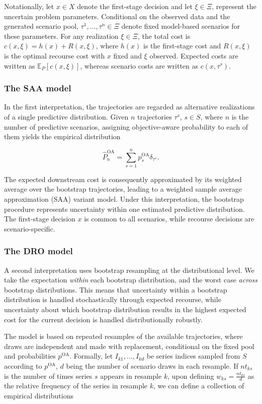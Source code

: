 \documentclass[mnsc,sglanonrev]{informs4}  %
\theoremstyle{remark}\newtheorem{remark}{Remark}
\begin{document}
Notationally, let \(x\in X\) denote the first-stage decision and let \(\xi \in \Xi\), represent the uncertain problem parameters. Conditional on the observed data and the generated scenario pool, \(\tau^1,\ldots,\tau^n\in\Xi\) denote fixed model-based scenarios for these parameters. For any realization \(\xi\in\Xi\), the total cost is $c(x,\xi)=h(x)+R(x,\xi)$, where $h(x)$ is the first-stage cost and $R(x,\xi)$ is the optimal recourse cost with $x$ fixed and $\xi$ observed. Expected costs are written as \(\mathbb E_P[c(x,\xi)]\), whereas scenario costs are written as \(c(x,\tau^s)\).

\subsubsection{The SAA model}
In the first interpretation, the trajectories are regarded as alternative realizations of a single predictive distribution. Given \(n\) trajectories \(\tau^s\), \(s\in S\), where $n$ is the number of predictive scenarios, assigning objective-aware probability to each of them yields the empirical distribution

$$ \widehat P_n^{\mathrm{OA}} =\sum_{s=1}^{n}p_s^{\mathrm{OA}}\delta_{\tau^s}. $$

The expected downstream cost is consequently approximated by its weighted average over the bootstrap trajectories, leading to a weighted sample average approximation (SAA) variant model. Under this interpretation, the bootstrap procedure represents uncertainty within one estimated predictive distribution.
The first-stage decision $x$ is common to all scenarios, while recourse decisions are scenario-specific.

\subsubsection{The DRO model}
A second interpretation uses bootstrap resampling at the distributional level.
We take the expectation {\it within} each bootstrap distribution, and the worst case {\it across} bootstrap distributions.
This means that uncertainty within a bootstrap distribution is handled stochastically through expected recourse, while uncertainty about which bootstrap distribution results in the highest expected cost for the current decision is handled distributionally robustly.

The model is based on repeated resamples of the available trajectories, where draws are independent and made with replacement, conditional on the fixed pool and probabilities \(p^{\mathrm{OA}}\). Formally, let $I_{k1},\ldots,I_{kd} $ be series indices sampled from $S$ according to \(p^{\mathrm{OA}}\), $d$ being the number of scenario draws in each resample. If \(nt_{ks}\) is the number of times series \(s\) appears in resample \(k\), upon defining $ w_{ks}=\frac{nt_{ks}}{d}$ as the relative frequency of the series in resample \(k\), we can define a collection of empirical distributions
\end{document}
